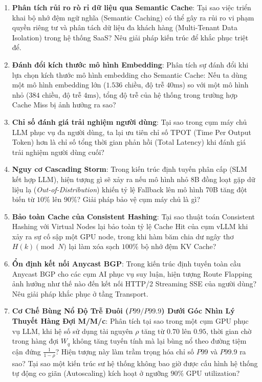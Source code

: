 \begin{enumerate}[label=\textbf{A\arabic*.}]
  \item \textbf{Phân tích rủi ro rò rỉ dữ liệu qua Semantic Cache}: Tại sao việc triển khai bộ nhớ đệm ngữ nghĩa (Semantic Caching) có thể gây ra rủi ro vi phạm quyền riêng tư và phân tách dữ liệu đa khách hàng (Multi-Tenant Data Isolation) trong hệ thống SaaS? Nêu giải pháp kiến trúc để khắc phục triệt để.
  \item \textbf{Đánh đổi kích thước mô hình Embedding}: Phân tích sự đánh đổi khi lựa chọn kích thước mô hình embedding cho Semantic Cache: Nếu ta dùng một mô hình embedding lớn ($1.536$ chiều, độ trễ $40\text{ms}$) so với một mô hình nhỏ ($384$ chiều, độ trễ $4\text{ms}$), tổng độ trễ của hệ thống trong trường hợp Cache Miss bị ảnh hưởng ra sao?
  \item \textbf{Chỉ số đánh giá trải nghiệm người dùng}: Tại sao trong cụm máy chủ LLM phục vụ đa người dùng, ta lại ưu tiên chỉ số TPOT (Time Per Output Token) hơn là chỉ số tổng thời gian phản hồi (Total Latency) khi đánh giá trải nghiệm người dùng cuối?
  \item \textbf{Nguy cơ Cascading Storm}: Trong kiến trúc định tuyến phân cấp (SLM kết hợp LLM), hiện tượng gì sẽ xảy ra nếu mô hình nhỏ 8B đồng loạt gặp dữ liệu lạ (\textit{Out-of-Distribution}) khiến tỷ lệ Fallback lên mô hình 70B tăng đột biến từ $10\%$ lên $90\%$? Giải pháp bảo vệ cụm máy chủ là gì?
  \item \textbf{Bảo toàn Cache của Consistent Hashing}: Tại sao thuật toán Consistent Hashing với Virtual Nodes lại bảo toàn tỷ lệ Cache Hit của cụm vLLM khi xảy ra sự cố sập một GPU node, trong khi hàm băm chia dư ngây thơ $H(k) \pmod N$ lại làm xóa sạch $100\%$ bộ nhớ đệm KV Cache?
  \item \textbf{Ổn định kết nối Anycast BGP}: Trong kiến trúc định tuyến toàn cầu Anycast BGP cho các cụm AI phục vụ suy luận, hiện tượng Route Flapping ảnh hưởng như thế nào đến kết nối HTTP/2 Streaming SSE của người dùng? Nêu giải pháp khắc phục ở tầng Transport.
  \item \textbf{Cơ Chế Bùng Nổ Độ Trễ Đuôi ($P99/P99.9$) Dưới Góc Nhìn Lý Thuyết Hàng Đợi M/M/c}: Phân tích tại sao trong một cụm GPU phục vụ LLM, khi hệ số sử dụng tài nguyên $\rho$ tăng từ $0.70$ lên $0.95$, thời gian chờ trong hàng đợi $W_q$ không tăng tuyến tính mà lại bùng nổ theo đường tiệm cận đứng $\frac{1}{1-\rho}$? Hiện tượng này làm trầm trọng hóa chỉ số $P99$ và $P99.9$ ra sao? Tại sao một kiến trúc sư hệ thống không bao giờ được cấu hình hệ thống tự động co giãn (Autoscaling) kích hoạt ở ngưỡng $90\%$ GPU utilization?

\end{enumerate}
